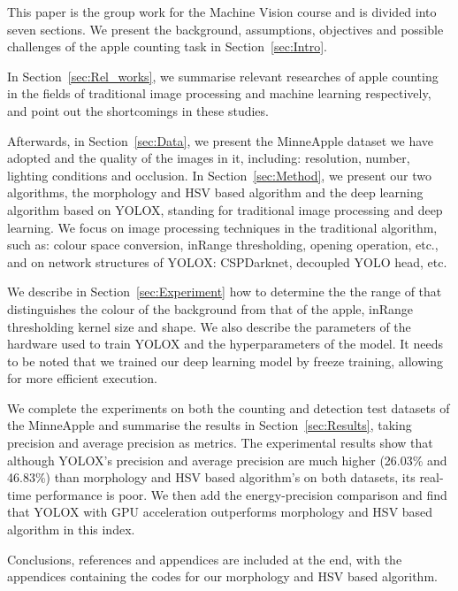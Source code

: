 This paper is the group work for the Machine Vision course and is divided into seven sections. We present the background, assumptions, objectives and possible challenges of the apple counting task in Section~\ref{sec:Intro}.

In Section~\ref{sec:Rel_works}, we summarise relevant researches of apple counting in the fields of traditional image processing and machine learning respectively, and point out the shortcomings in these studies.

Afterwards, in Section~\ref{sec:Data}, we present the MinneApple dataset we have adopted and the quality of the images in it, including: resolution, number, lighting conditions and occlusion. In Section~\ref{sec:Method}, we present our two algorithms, the morphology and HSV based algorithm and the deep learning algorithm based on YOLOX, standing for traditional image processing and deep learning. We focus on image processing techniques in the traditional algorithm, such as: colour space conversion, inRange thresholding, opening operation, etc., and on network structures of YOLOX: CSPDarknet, decoupled YOLO head, etc.

We describe in Section~\ref{sec:Experiment} how to determine the the range of that distinguishes the colour of the background from that of the apple, inRange thresholding kernel size and shape. We also describe the parameters of the hardware used to train YOLOX and the hyperparameters of the model. It needs to be noted that we trained our deep learning model by freeze training, allowing for more efficient execution.

We complete the experiments on both the counting and detection test datasets of the MinneApple and summarise the results in Section~\ref{sec:Results}, taking precision and average precision as metrics. The experimental results show that although YOLOX's precision and average precision are much higher (26.03\% and 46.83\%) than morphology and HSV based algorithm's on both datasets, its real-time performance is poor. We then add the energy-precision comparison and find that YOLOX with GPU acceleration outperforms morphology and HSV based algorithm in this index.

Conclusions, references and appendices are included at the end, with the appendices containing the codes for our morphology and HSV based algorithm.



